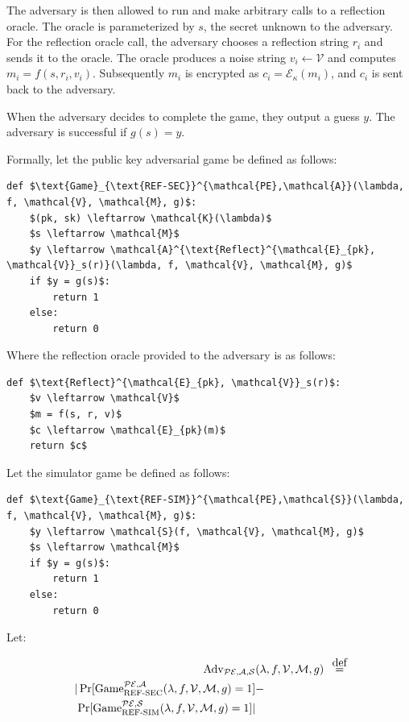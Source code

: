 \documentclass{sig-alternate-05-2015}
\newcommand\defeq{\stackrel{\mathclap{\normalfont\mbox{def}}}{=}}
\begin{document}
The adversary is then allowed to run and make arbitrary calls to a reflection
oracle. The oracle is parameterized by $s$, the secret unknown to the
adversary.  For the reflection oracle call, the adversary chooses a reflection
string $r_i$ and sends it to the oracle. The oracle produces a noise string
$v_i \leftarrow \mathcal{V}$ and computes $m_i = f(s, r_i, v_i)$.  Subsequently
$m_i$ is encrypted as $c_i = \mathcal{E}_\kappa(m_i)$, and $c_i$ is sent back
to the adversary.

When the adversary decides to complete the game, they output a guess $y$. The
adversary is successful if $g(s) = y$.

Formally, let the public key adversarial game be defined as follows:

\begin{lstlisting}[texcl,mathescape]
def $\text{Game}_{\text{REF-SEC}}^{\mathcal{PE},\mathcal{A}}(\lambda, f, \mathcal{V}, \mathcal{M}, g)$:
    $(pk, sk) \leftarrow \mathcal{K}(\lambda)$
    $s \leftarrow \mathcal{M}$
    $y \leftarrow \mathcal{A}^{\text{Reflect}^{\mathcal{E}_{pk}, \mathcal{V}}_s(r)}(\lambda, f, \mathcal{V}, \mathcal{M}, g)$
    if $y = g(s)$:
        return 1
    else:
        return 0
\end{lstlisting}

Where the reflection oracle provided to the adversary is as follows:

\begin{lstlisting}[texcl,mathescape]
def $\text{Reflect}^{\mathcal{E}_{pk}, \mathcal{V}}_s(r)$:
    $v \leftarrow \mathcal{V}$
    $m = f(s, r, v)$
    $c \leftarrow \mathcal{E}_{pk}(m)$
    return $c$
\end{lstlisting}

Let the simulator game be defined as follows:

\begin{lstlisting}[texcl,mathescape]
def $\text{Game}_{\text{REF-SIM}}^{\mathcal{PE},\mathcal{S}}(\lambda, f, \mathcal{V}, \mathcal{M}, g)$:
    $y \leftarrow \mathcal{S}(f, \mathcal{V}, \mathcal{M}, g)$
    $s \leftarrow \mathcal{M}$
    if $y = g(s)$:
        return 1
    else:
        return 0
\end{lstlisting}

Let:

\begin{align*}
    \text{Adv}_{\mathcal{PE}, \mathcal{A}, \mathcal{S}}&(\lambda, f, \mathcal{V}, \mathcal{M}, g) &\defeq\\
    |\Pr[\text{Game}_{\text{REF-SEC}}^{\mathcal{PE},\mathcal{A}}(\lambda, f, \mathcal{V}, \mathcal{M}, g) = 1] &-\\
    \Pr[\text{Game}_{\text{REF-SIM}}^{\mathcal{PE},\mathcal{S}}(\lambda, f, \mathcal{V}, \mathcal{M}, g) = 1]| &
\end{align*}
\end{document}
